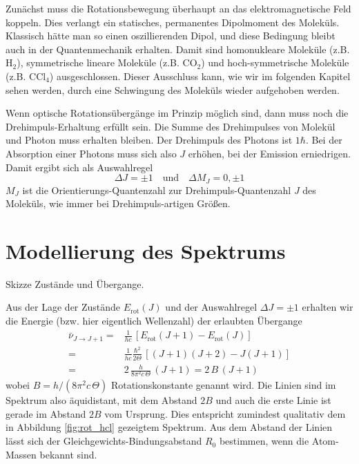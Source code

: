 Zunächst muss die Rotationsbewegung überhaupt an das elektromagnetische Feld koppeln. Dies verlangt  ein statisches, permanentes Dipolmoment des Moleküls. Klassisch hätte man so einen oszillierenden Dipol, und diese Bedingung bleibt auch in der Quantenmechanik erhalten. Damit sind homonukleare Moleküle (z.B. H$_2$), symmetrische lineare Moleküle (z.B. CO$_2$) und hoch-symmetrische Moleküle (z.B. CCl$_4$) ausgeschlossen. Dieser Ausschluss kann, wie wir im folgenden Kapitel sehen werden, durch eine Schwingung des Moleküls wieder aufgehoben werden.

Wenn optische Rotationsübergänge im Prinzip möglich sind, dann muss noch die Drehimpuls-Erhaltung erfüllt sein. Die Summe des Drehimpulses von Molekül und Photon muss erhalten bleiben. Der Drehimpuls des Photons ist $1 \hbar$. Bei der Absorption einer Photons muss sich also $J$ erhöhen, bei der Emission erniedrigen. Damit ergibt sich als Auswahlregel
\begin{equation}
\Delta J = \pm 1 \quad \text{und} \quad \Delta M_J = 0, \pm 1
\end{equation}
$M_J$ ist die Orientierungs-Quantenzahl zur Drehimpuls-Quantenzahl $J$ des Moleküls, wie immer bei Drehimpuls-artigen Größen.

\section{Modellierung des Spektrums}

\begin{marginfigure}
\caption{Skizze Zustände und Übergange.}
\end{marginfigure}


Aus der Lage der Zustände $E_\text{rot}(J)$ und der Auswahlregel $\Delta J = \pm 1$ erhalten wir die  Energie (bzw. hier eigentlich Wellenzahl) der erlaubten Übergange
\begin{align}
 \bar{\nu}_{J \rightarrow J + 1} =& \frac{1}{h c}  \, \left[ E_\text{rot}(J+1) - E_\text{rot}(J) \right]
 \\ 
 =  & \frac{1}{h c}\frac{\hbar^2}{2 \Theta} \, \left[ (J+1)(J+2) - J (J+1) \right] \\
 = & 2 \, \frac{h}{8 \pi^2 c \, \Theta} \, \left( J +1 \right) = 2 \, B \, (J+1)
\end{align}
wobei $B = h / (8 \pi^2 c \, \Theta)$ Rotationskonstante genannt wird. Die Linien sind im Spektrum also äquidistant, mit dem Abstand $2B$ und auch die erste Linie ist gerade im Abstand $2B$ vom Ursprung. Dies entspricht zumindest qualitativ dem in Abbildung \ref{fig:rot_hcl} gezeigtem Spektrum. Aus dem Abstand der Linien lässt sich der Gleichgewichts-Bindungsabstand $R_0$ bestimmen, wenn die Atom-Massen bekannt sind.



